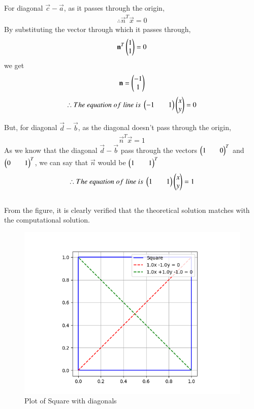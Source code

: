 \documentclass[journal]{IEEEtran}
\begin{document}
For diagonal $\vec{c}-\vec{a}$, as it passes through the origin,
\begin{align*}
    \therefore \vec{n}^T\vec{x}=0
\end{align*}
By substituting the vector through which it passes through,
\begin{align*}
    \mathbf{n}^T\begin{pmatrix}1\\1\end{pmatrix}=0
\end{align*}
we get
\begin{align*}
    \mathbf{n}=\begin{pmatrix}-1\\1\end{pmatrix}
\end{align*}
\begin{align*}
    \therefore The\;equation\;of\;line\;is\;\begin{pmatrix}-1&&1\end{pmatrix}\begin{pmatrix}x\\y\end{pmatrix}=0
\end{align*}
\newpage
\vspace*{0.25cm}

But, for diagonal $\vec{d}-\vec{b}$, as the diagonal doesn't pass through the origin,
\begin{align*}
    \vec{n}^T\vec{x}=1
\end{align*}
As we know that the diagonal $\vec{d}-\vec{b}$ pass through the vectors $\begin{pmatrix}1&&0\end{pmatrix}^T$ and $\begin{pmatrix}0&&1\end{pmatrix}^T$, we can say that $\vec{n}$ would be $\begin{pmatrix}1&&1\end{pmatrix}^T$ 
\begin{align*}
    \therefore The\;equation\;of\;line\;is\;\begin{pmatrix}1&&1\end{pmatrix}\begin{pmatrix}x\\y\end{pmatrix}=1
\end{align*}
\\
From the figure, it is clearly verified that the theoretical solution matches with the computational solution.\\
\begin{figure}[H]
    \centering
    \includegraphics[width=0.6\columnwidth]{figs/Figure_1.png}
    \caption*{Plot of Square with diagonals}
    \label{fig:1}
\end{figure}
\end{document}
